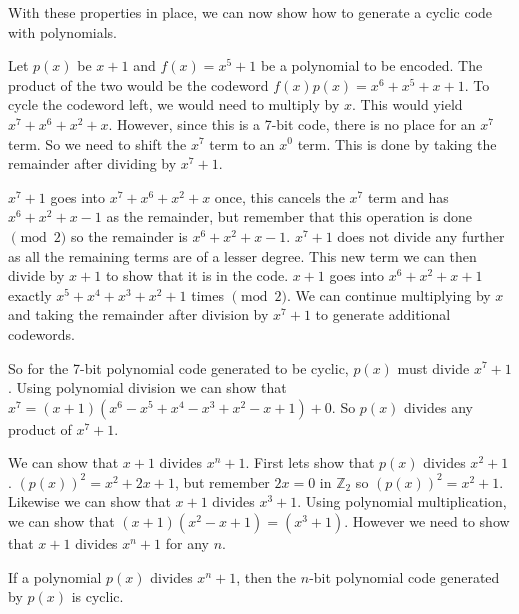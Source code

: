
With these properties in place, we can now show how to generate a cyclic code with polynomials.  

\begin{example}{}
Let $p(x)$ be $x+1$ and $f(x) = x^5 + 1$ be a polynomial to be encoded.  The product of the two would be the codeword $f(x)p(x) = x^6 + x^5 + x + 1$.  To cycle the codeword left, we would need to multiply by $x$. This would yield $x^7 + x^6 + x^2 + x$.  However, since this is a 7-bit code, there is no place for an $x^7$ term.  So we need to shift the $x^7$ term to an $x^0$ term.  This is done by 
taking the remainder after dividing by $x^7+1$.  

$x^7 + 1$ goes into $x^7 + x^6 + x^2 + x$ once, this cancels the $x^7$ term and has $x^6 + x^2 + x - 1$ as the remainder, but remember that this operation is done $\pmod 2$ so the remainder is $x^6 + x^2 + x - 1$.  $x^7 + 1$ does not divide any further as all the remaining terms are of a lesser degree.  
This new term we can then divide by $x+1$ to show that it is in the code.  $x+1$ goes into $x^6 + x^2 + x + 1$ exactly $x^5 + x^4 + x^3 + x^2 + 1$ times $\pmod2$.  We can continue multiplying by $x$ and taking the remainder after division by $x^7 + 1$ to generate additional codewords.

So for the 7-bit polynomial code generated to be cyclic, $p(x)$ must divide $x^7 + 1$.  Using polynomial division we can show that $x^7 = (x+1)(x^6-x^5+x^4-x^3+x^2-x+1) + 0$.  So $p(x)$ divides any product of $x^7+1$.

We can show that $x+1$ divides $x^n + 1$.  First lets show that $p(x)$ divides $x^2 + 1$.  $(p(x))^2 = x^2 + 2x + 1$, but remember $2x = 0$ in $\mathbb{Z}_2$ so $(p(x))^2 = x^2 + 1$. Likewise we can show that $x+1$ divides $x^3 + 1$.  Using polynomial multiplication, we can show that $(x+1)(x^2 -x + 1) = (x^3 + 1)$.  However we need to show that $x+1$ divides $x^n+1$ for any $n$.
\end {example}

\begin{prop}{}
If a polynomial $p(x)$ divides $x^n + 1$, then the $n$-bit polynomial code generated by $p(x)$ is cyclic.
\end {prop}

